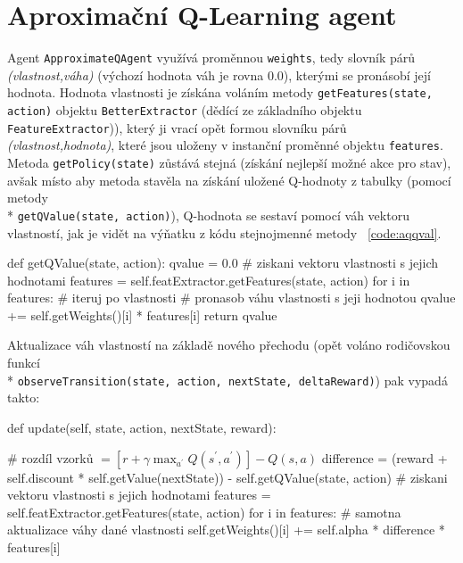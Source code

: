 \section{Aproximační Q-Learning agent}
\label{impl:aproxq}
Agent \texttt{ApproximateQAgent} využívá proměnnou \texttt{weights}, tedy slovník párů \textit{(vlastnost,váha)} (výchozí hodnota váh je rovna $0.0$), kterými se pronásobí její hodnota. Hodnota vlastnosti je získána voláním metody \texttt{getFeatures(state, action)} objektu \texttt{BetterExtractor} (dědící ze základního objektu \texttt{FeatureExtractor})), který ji vrací opět formou slovníku párů \textit{(vlastnost,hodnota)}, které jsou uloženy v instanční proměnné objektu \texttt{features}. Metoda \texttt{getPolicy(state)} zůstává stejná (získání nejlepší možné akce pro stav), avšak místo aby metoda stavěla na získání uložené Q-hodnoty z tabulky (pomocí metody \\* \texttt{getQValue(state, action)}), Q-hodnota se sestaví pomocí váh vektoru vlastností, jak je vidět na výňatku z kódu stejnojmenné metody ~\ref{code:aqqval}.
\begin{python}[label={code:aqqval}]
def getQValue(state, action):
   qvalue = 0.0
   # ziskani vektoru vlastnosti s jejich hodnotami
   features = self.featExtractor.getFeatures(state, action)
   for i in features: # iteruj po vlastnosti
      # pronasob váhu vlastnosti s jeji hodnotou
      qvalue += self.getWeights()[i] * features[i]
   return qvalue
\end{python}
Aktualizace váh vlastností na základě nového přechodu (opět voláno rodičovskou funkcí \\* \texttt{observeTransition(state, action, nextState, deltaReward)}) pak vypadá takto:
\begin{python}
def update(self, state, action, nextState, reward):

   # rozdíl vzorků $= \left [ r + \gamma \max_{a^\prime}Q(s^\prime,a^\prime) \right] - Q(s,a)  $
   difference = (reward + self.discount * self.getValue(nextState)) 
                - self.getQValue(state, action)
   # ziskani vektoru vlastnosti s jejich hodnotami
   features = self.featExtractor.getFeatures(state, action)
   for i in features:
      # samotna aktualizace váhy dané vlastnosti
      self.getWeights()[i] += self.alpha * difference * features[i]
\end{python}


